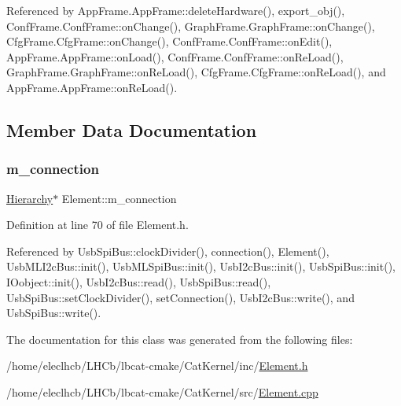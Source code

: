 Referenced by App\+Frame.\+App\+Frame\+::delete\+Hardware(), export\+\_\+obj(), Conf\+Frame.\+Conf\+Frame\+::on\+Change(), Graph\+Frame.\+Graph\+Frame\+::on\+Change(), Cfg\+Frame.\+Cfg\+Frame\+::on\+Change(), Conf\+Frame.\+Conf\+Frame\+::on\+Edit(), App\+Frame.\+App\+Frame\+::on\+Load(), Conf\+Frame.\+Conf\+Frame\+::on\+Re\+Load(), Graph\+Frame.\+Graph\+Frame\+::on\+Re\+Load(), Cfg\+Frame.\+Cfg\+Frame\+::on\+Re\+Load(), and App\+Frame.\+App\+Frame\+::on\+Re\+Load().



\subsection{Member Data Documentation}
\mbox{\label{classElement_abe3de7a5dbbc9a6dd2d7e012e5fdb266}} 
\subsubsection{\texorpdfstring{m\+\_\+connection}{m\_connection}}
{\footnotesize\ttfamily \hyperlink{classHierarchy}{Hierarchy}$\ast$ Element\+::m\+\_\+connection\hspace{0.3cm}{\ttfamily [protected]}}



Definition at line 70 of file Element.\+h.



Referenced by Usb\+Spi\+Bus\+::clock\+Divider(), connection(), Element(), Usb\+M\+L\+I2c\+Bus\+::init(), Usb\+M\+L\+Spi\+Bus\+::init(), Usb\+I2c\+Bus\+::init(), Usb\+Spi\+Bus\+::init(), I\+Oobject\+::init(), Usb\+I2c\+Bus\+::read(), Usb\+Spi\+Bus\+::read(), Usb\+Spi\+Bus\+::set\+Clock\+Divider(), set\+Connection(), Usb\+I2c\+Bus\+::write(), and Usb\+Spi\+Bus\+::write().



The documentation for this class was generated from the following files\+:\begin{DoxyCompactItemize}
\item 
/home/eleclhcb/\+L\+H\+Cb/lbcat-\/cmake/\+Cat\+Kernel/inc/\hyperlink{Element_8h}{Element.\+h}\item 
/home/eleclhcb/\+L\+H\+Cb/lbcat-\/cmake/\+Cat\+Kernel/src/\hyperlink{Element_8cpp}{Element.\+cpp}\end{DoxyCompactItemize}
